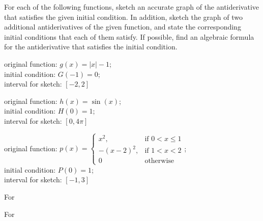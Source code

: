 \begin{activity} \label{A:5.1.2}  For each of the following functions, sketch an accurate graph of the antiderivative that satisfies the given initial condition.  In addition, sketch the graph of two additional antiderivatives of the given function, and state the corresponding initial conditions that each of them satisfy.  If possible, find an algebraic formula for the antiderivative that satisfies the initial condition.
\ba
      \item  original function: $g(x) = \left| x \right| - 1$; \\
      initial condition: $G(-1) = 0$; \\
      interval for sketch: $[-2,2]$
      \item  original function: $h(x) = \sin(x)$; \\
      initial condition: $H(0) = 1$; \\
      interval for sketch: $[0,4\pi]$
      \item  original function: $p(x) =
\begin{cases}
x^2, & \text{if } 0 < x \le 1 \\
-(x-2)^2, & \text{if } 1 < x < 2 \\
0 & \text{otherwise}
\end{cases}
$; \\
initial condition: $P(0) = 1$; \\
interval for sketch: $[-1,3]$
\ea
\end{activity}
\begin{smallhint}
For 
\end{smallhint}
\begin{bighint}
For 
\end{bighint}
\begin{activitySolution}
\ba
         \item  
\ea
\end{activitySolution}
\aftera